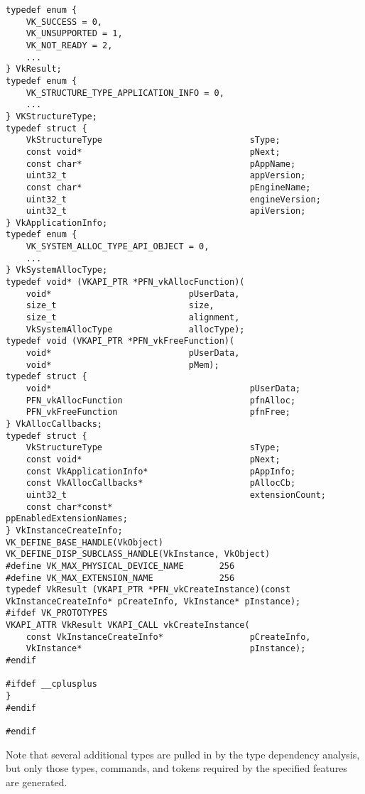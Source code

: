 \documentclass{article}
\begin{document}
\begin{verbatim}
typedef enum {
    VK_SUCCESS = 0,
    VK_UNSUPPORTED = 1,
    VK_NOT_READY = 2,
    ...
} VkResult;
typedef enum {
    VK_STRUCTURE_TYPE_APPLICATION_INFO = 0,
    ...
} VKStructureType;
typedef struct {
    VkStructureType                             sType;
    const void*                                 pNext;
    const char*                                 pAppName;
    uint32_t                                    appVersion;
    const char*                                 pEngineName;
    uint32_t                                    engineVersion;
    uint32_t                                    apiVersion;
} VkApplicationInfo;
typedef enum {
    VK_SYSTEM_ALLOC_TYPE_API_OBJECT = 0,
    ...
} VkSystemAllocType;
typedef void* (VKAPI_PTR *PFN_vkAllocFunction)(
    void*                           pUserData,
    size_t                          size,
    size_t                          alignment,
    VkSystemAllocType               allocType);
typedef void (VKAPI_PTR *PFN_vkFreeFunction)(
    void*                           pUserData,
    void*                           pMem);
typedef struct {
    void*                                       pUserData;
    PFN_vkAllocFunction                         pfnAlloc;
    PFN_vkFreeFunction                          pfnFree;
} VkAllocCallbacks;
typedef struct {
    VkStructureType                             sType;
    const void*                                 pNext;
    const VkApplicationInfo*                    pAppInfo;
    const VkAllocCallbacks*                     pAllocCb;
    uint32_t                                    extensionCount;
    const char*const*                           ppEnabledExtensionNames;
} VkInstanceCreateInfo;
VK_DEFINE_BASE_HANDLE(VkObject)
VK_DEFINE_DISP_SUBCLASS_HANDLE(VkInstance, VkObject)
#define VK_MAX_PHYSICAL_DEVICE_NAME       256
#define VK_MAX_EXTENSION_NAME             256
typedef VkResult (VKAPI_PTR *PFN_vkCreateInstance)(const VkInstanceCreateInfo* pCreateInfo, VkInstance* pInstance);
#ifdef VK_PROTOTYPES
VKAPI_ATTR VkResult VKAPI_CALL vkCreateInstance(
    const VkInstanceCreateInfo*                 pCreateInfo,
    VkInstance*                                 pInstance);
#endif

#ifdef __cplusplus
}
#endif

#endif
\end{verbatim}

Note that several additional types are pulled in by the type dependency
analysis, but only those types, commands, and tokens required by the
specified features are generated.
\end{document}
